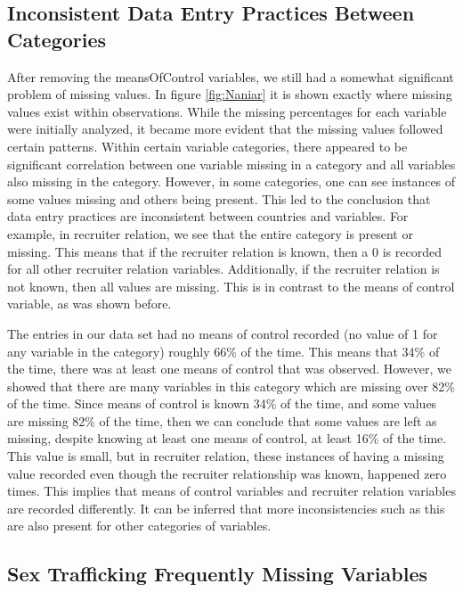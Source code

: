 \documentclass{article} %
\begin{document}
	\subsection{Inconsistent Data Entry Practices Between Categories}
	
	After removing the meansOfControl variables, we still had a somewhat significant problem of missing values. In figure \ref{fig:Naniar} it is shown exactly where missing values exist within observations. While the missing percentages for each variable were initially analyzed, it became more evident that the missing values followed certain patterns. Within certain variable categories, there appeared to be significant correlation between one variable missing in a category and all variables also missing in the category. However, in some categories, one can see instances of some values missing and others being present. This led to the conclusion that data entry practices are inconsistent between countries and variables. For example, in recruiter relation, we see that the entire category is present or missing. This means that if the recruiter relation is known, then a 0 is recorded for all other recruiter relation variables. Additionally, if the recruiter relation is not known, then all values are missing. This is in contrast to the means of control variable, as was shown before.
	
	The entries in our data set had no means of control recorded (no value of 1 for any variable in the category) roughly 66\% of the time. This means that 34\% of the time, there was at least one means of control that was observed. However, we showed that there are many variables in this category which are missing over 82\% of the time. Since means of control is known 34\% of the time, and some values are missing 82\% of the time, then we can conclude that some values are left as missing, despite knowing at least one means of control, at least 16\% of the time. This value is small, but in recruiter relation, these instances of having a missing value recorded even though the recruiter relationship was known, happened zero times. This implies that means of control variables and recruiter relation variables are recorded differently. It can be inferred that more inconsistencies such as this are also present for other categories of variables.
	
	\subsection{Sex Trafficking Frequently Missing Variables}
	
\end{document}
